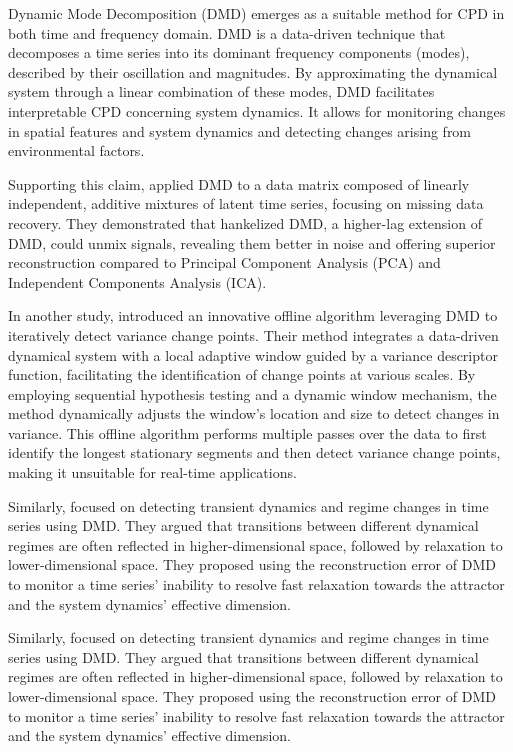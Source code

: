 Dynamic Mode Decomposition (DMD) emerges as a suitable method for CPD in both time and frequency domain. DMD is a data-driven technique that decomposes a time series into its dominant frequency components (modes), described by their oscillation and magnitudes. By approximating the dynamical system through a linear combination of these modes, DMD facilitates interpretable CPD concerning system dynamics. It allows for monitoring changes in spatial features and system dynamics and detecting changes arising from environmental factors.

Supporting this claim, \citet{Prasadan2020} applied DMD to a data matrix composed of linearly independent, additive mixtures of latent time series, focusing on missing data recovery. They demonstrated that hankelized DMD, a higher-lag extension of DMD, could unmix signals, revealing them better in noise and offering superior reconstruction compared to Principal Component Analysis (PCA) and Independent Components Analysis (ICA).

In another study, \citet{Srivastava2017} introduced an innovative offline algorithm leveraging DMD to iteratively detect variance change points. Their method integrates a data-driven dynamical system with a local adaptive window guided by a variance descriptor function, facilitating the identification of change points at various scales. By employing sequential hypothesis testing and a dynamic window mechanism, the method dynamically adjusts the window's location and size to detect changes in variance. This offline algorithm performs multiple passes over the data to first identify the longest stationary segments and then detect variance change points, making it unsuitable for real-time applications.

Similarly, \citet{Gottwald2020} focused on detecting transient dynamics and regime changes in time series using DMD. They argued that transitions between different dynamical regimes are often reflected in higher-dimensional space, followed by relaxation to lower-dimensional space. They proposed using the reconstruction error of DMD to monitor a time series' inability to resolve fast relaxation towards the attractor and the system dynamics' effective dimension.

Similarly, \citet{Gottwald2020} focused on detecting transient dynamics and regime changes in time series using DMD. They argued that transitions between different dynamical regimes are often reflected in higher-dimensional space, followed by relaxation to lower-dimensional space. They proposed using the reconstruction error of DMD to monitor a time series' inability to resolve fast relaxation towards the attractor and the system dynamics' effective dimension.

